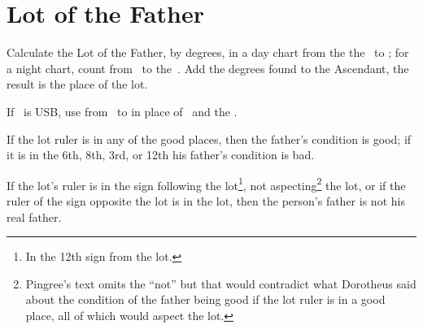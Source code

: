 \section{Lot of the Father}

Calculate the Lot of the Father, by degrees, in a day chart from the the \Sun\, to \Saturn; for a night chart, count from \Saturn\, to the \Sun\,. Add the degrees found to the Ascendant, the result is the place of the lot.

If \Saturn\, is USB, use from \Mars\, to \Jupiter in place of \Saturn\, and the \Sun.

If the lot ruler is in any of the good places, then the father's condition is good; if it is in the 6th, 8th, 3rd, or 12th his father's condition is bad.

If the lot's ruler is in the sign following the lot\footnote{In the 12th sign from the lot.}, not aspecting\footnote{Pingree's text omits the ``not'' but that would contradict what Dorotheus said about the condition of the father being good if the lot ruler is in a good place, all of which would aspect the lot.} the lot, or if the ruler of the sign opposite the lot is in the lot, then the person's father is not his real father.

